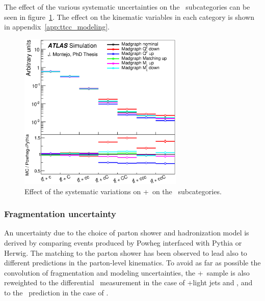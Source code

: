 The effect of the various systematic uncertainties on the \ttcc\ subcategories can be seen in figure~\ref{fig:mgcc_extHFtype}.
The effect on the kinematic variables in each category is shown in appendix~\ref{app:ttcc_modeling}.

\begin{figure}[!t]
\begin{center}
\includegraphics[width=0.7\textwidth]{Modeling/Figures/mgcc_realHFcc_extHFtype_ttcc_norm.eps}
\caption{Effect of the systematic variations on \madgraph+\pythia\ on the \ttcc\ subcategories.}
\label{fig:mgcc_extHFtype}
\end{center}
\end{figure}

\subsubsection{Fragmentation uncertainty}
An uncertainty due to the choice of parton shower and hadronization model 
is derived by comparing events produced by {\sc Powheg} interfaced with {\sc Pythia} 
or {\sc Herwig}. The matching to the parton shower has been observed to lead also to different predictions
in the parton-level kinematics.
To avoid as far as possible the convolution of fragmentation and modeling uncertainties, 
the \powheg+\herwig\ sample is also reweighted to the differential \xsec\ measurement in the case of \ttbar+light jets and \ttcc, and to the \ShOL\ prediction in the case of \ttbb.

